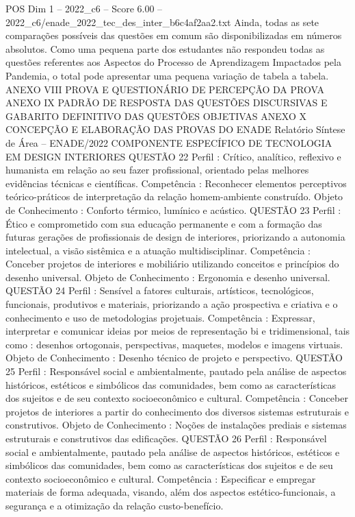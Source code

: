 \begin{textsample}{POS Dim 1 – 2022\_c6 – Score 6.00 – 2022\_c6/enade\_2022\_tec\_des\_inter\_b6c4af2aa2.txt}
Ainda, todas as sete comparações possíveis das questões em comum são disponibilizadas em números absolutos.
Como uma pequena parte dos estudantes não respondeu todas as questões referentes aos Aspectos do Processo de Aprendizagem Impactados pela Pandemia, o total pode apresentar uma pequena variação de tabela a tabela.
ANEXO VIII PROVA E QUESTIONÁRIO DE PERCEPÇÃO DA PROVA ANEXO IX PADRÃO DE RESPOSTA DAS QUESTÕES DISCURSIVAS E GABARITO DEFINITIVO DAS QUESTÕES OBJETIVAS ANEXO X CONCEPÇÃO E ELABORAÇÃO DAS PROVAS DO ENADE Relatório Síntese de Área – ENADE/2022 COMPONENTE ESPECÍFICO DE TECNOLOGIA EM DESIGN INTERIORES QUESTÃO 22 Perfil : Crítico, analítico, reflexivo e humanista em relação ao seu fazer profissional, orientado pelas melhores evidências técnicas e científicas.
Competência : Reconhecer elementos perceptivos teórico-práticos de interpretação da relação homem-ambiente construído.
Objeto de Conhecimento : Conforto térmico, lumínico e acústico.
QUESTÃO 23 Perfil : Ético e comprometido com sua educação permanente e com a formação das futuras gerações de profissionais de design de interiores, priorizando a autonomia intelectual, a visão sistêmica e a atuação multidisciplinar.
Competência : Conceber projetos de interiores e mobiliário utilizando conceitos e princípios do desenho universal.
Objeto de Conhecimento : Ergonomia e desenho universal.
QUESTÃO 24 Perfil : Sensível a fatores culturais, artísticos, tecnológicos, funcionais, produtivos e materiais, priorizando a ação prospectiva e criativa e o conhecimento e uso de metodologias projetuais.
Competência : Expressar, interpretar e comunicar ideias por meios de representação bi e tridimensional, tais como : desenhos ortogonais, perspectivas, maquetes, modelos e imagens virtuais.
Objeto de Conhecimento : Desenho técnico de projeto e perspectivo.
QUESTÃO 25 Perfil : Responsável social e ambientalmente, pautado pela análise de aspectos históricos, estéticos e simbólicos das comunidades, bem como as características dos sujeitos e de seu contexto socioeconômico e cultural.
Competência : Conceber projetos de interiores a partir do conhecimento dos diversos sistemas estruturais e construtivos.
Objeto de Conhecimento : Noções de instalações prediais e sistemas estruturais e construtivos das edificações.
QUESTÃO 26 Perfil : Responsável social e ambientalmente, pautado pela análise de aspectos históricos, estéticos e simbólicos das comunidades, bem como as características dos sujeitos e de seu contexto socioeconômico e cultural.
Competência : Especificar e empregar materiais de forma adequada, visando, além dos aspectos estético-funcionais, a segurança e a otimização da relação custo-benefício.

\end{textsample}
